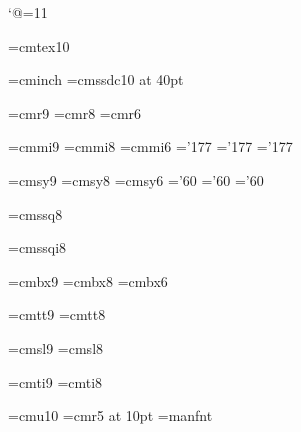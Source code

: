 
\catcode`@=11 %

\font\tentex=cmtex10

\font\inchhigh=cminch
\font\titlefont=cmssdc10 at 40pt

\font\ninerm=cmr9
\font\eightrm=cmr8
\font\sixrm=cmr6

\font\ninei=cmmi9
\font\eighti=cmmi8
\font\sixi=cmmi6
\skewchar\ninei='177 \skewchar\eighti='177 \skewchar\sixi='177

\font\ninesy=cmsy9
\font\eightsy=cmsy8
\font\sixsy=cmsy6
\skewchar\ninesy='60 \skewchar\eightsy='60 \skewchar\sixsy='60

\font\eightss=cmssq8

\font\eightssi=cmssqi8

\font\ninebf=cmbx9
\font\eightbf=cmbx8
\font\sixbf=cmbx6

\font\ninett=cmtt9
\font\eighttt=cmtt8

\hyphenchar{} %
\hyphenchar{}
\hyphenchar{}

\font\ninesl=cmsl9
\font\eightsl=cmsl8

\font\nineit=cmti9
\font\eightit=cmti8

\font\tenu=cmu10 %
\font\magnifiedfiverm=cmr5 at 10pt
\font\manual=manfnt %

\newskip\ttglue
\def\tenpoint{\def\rm{\fam0\tenrm}%
  \textfont0=\tenrm \scriptfont0=\sevenrm \scriptscriptfont0=\fiverm
  \textfont1=\teni \scriptfont1=\seveni \scriptscriptfont1=\fivei
  \textfont2=\tensy \scriptfont2=\sevensy \scriptscriptfont2=\fivesy
  \textfont3=\tenex \scriptfont3=\tenex \scriptscriptfont3=\tenex
  \def\it{\fam\itfam\tenit}%
  \textfont\itfam=\tenit
  \def\sl{\fam\slfam\tensl}%
  \textfont\slfam=\tensl
  \def\bf{\fam\bffam\tenbf}%
  \textfont\bffam=\tenbf \scriptfont\bffam=\sevenbf
   \scriptscriptfont\bffam=\fivebf
  \def\tt{\fam\ttfam\tentt}%
  \textfont\ttfam=\tentt
  \tt \ttglue=.5em plus.25em minus.15em
  \normalbaselineskip=12pt
  \def\MF{{\manual META}\-{\manual FONT}}%
  \let\sc=\eightrm
  \let\big=\tenbig
  \setbox\strutbox=\hbox{\vrule height8.5pt depth3.5pt width\z@}%
  \normalbaselines\rm}

\def\ninepoint{\def\rm{\fam0\ninerm}%
  \textfont0=\ninerm \scriptfont0=\sixrm \scriptscriptfont0=\fiverm
  \textfont1=\ninei \scriptfont1=\sixi \scriptscriptfont1=\fivei
  \textfont2=\ninesy \scriptfont2=\sixsy \scriptscriptfont2=\fivesy
  \textfont3=\tenex \scriptfont3=\tenex \scriptscriptfont3=\tenex
  \def\it{\fam\itfam\nineit}%
  \textfont\itfam=\nineit
  \def\sl{\fam\slfam\ninesl}%
  \textfont\slfam=\ninesl
  \def\bf{\fam\bffam\ninebf}%
  \textfont\bffam=\ninebf \scriptfont\bffam=\sixbf
   \scriptscriptfont\bffam=\fivebf
  \def\tt{\fam\ttfam\ninett}%
  \textfont\ttfam=\ninett
  \tt \ttglue=.5em plus.25em minus.15em
  \normalbaselineskip=11pt
  \def\MF{{\manual hijk}\-{\manual lmnj}}%
  \let\sc=\sevenrm
  \let\big=\ninebig
  \setbox\strutbox=\hbox{\vrule height8pt depth3pt width\z@}%
  \normalbaselines\rm}

